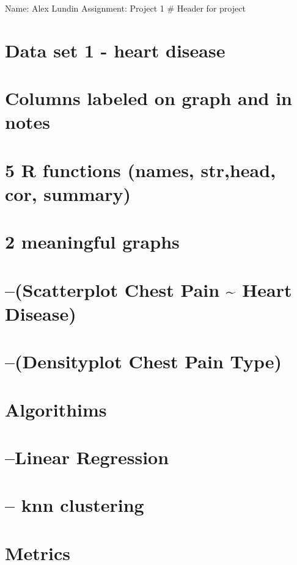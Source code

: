 \documentclass[]{article}
\title{}
\author{}
\date{}
\begin{document}
Name: Alex Lundin Assignment: Project 1 \# Header for project

\section{Data set 1 - heart disease}\label{data-set-1---heart-disease}

\section{Columns labeled on graph and in
notes}\label{columns-labeled-on-graph-and-in-notes}

\section{5 R functions (names, str,head, cor,
summary)}\label{r-functions-names-strhead-cor-summary}

\section{2 meaningful graphs}\label{meaningful-graphs}

\section{--(Scatterplot Chest Pain \textasciitilde{} Heart
Disease)}\label{scatterplot-chest-pain-heart-disease}

\section{--(Densityplot Chest Pain
Type)}\label{densityplot-chest-pain-type}

\section{Algorithims}\label{algorithims}

\section{--Linear Regression}\label{linear-regression}

\section{-- knn clustering}\label{knn-clustering}

\section{Metrics}\label{metrics}
\end{document}
